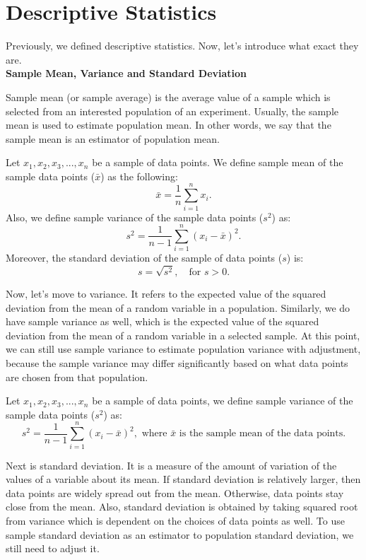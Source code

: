 \section{Descriptive Statistics}

Previously, we defined descriptive statistics. Now, let's introduce what exact they are.\\

\textbf{Sample Mean, Variance and Standard Deviation}

Sample mean (or sample average) is the average value of a sample which is selected from an interested population of an experiment. Usually, the sample mean is used to estimate population mean. In other words, we say that the sample mean is an estimator of population mean.

\begin{definition}
 Let $x_1, x_2, x_3, ..., x_n$ be a sample of data points. We define sample mean of the sample data points ($\bar{x}$) as the following: \[ \bar{x} = \frac{1}{n} \sum_{i=1}^{n} x_i.\] Also, we define sample variance of the sample data points ($s^2$) as: \[ s^2 = \frac{1}{n-1} \sum_{i=1}^{n}(x_i - \bar{x})^2.\] Moreover, the standard deviation of the sample of data points ($s$) is: \[ s = \sqrt{s^2}, \quad \text{for } s > 0.\]
\end{definition}

Now, let's move to variance. It refers to the expected value of the squared deviation from the mean of a random variable in a population. Similarly, we do have sample variance as well, which is the expected value of the squared deviation from the mean of a random variable in a selected sample. At this point, we can still use sample variance to estimate population variance with adjustment, because the sample variance may differ significantly based on what data points are chosen from that population.

\begin{definition}
Let $x_1, x_2, x_3, ..., x_n$ be a sample of data points, we define sample variance of the sample data points ($s^2$) as: \[ s^2 = \frac{1}{n-1} \sum_{i=1}^{n}(x_i - \bar{x})^2, \text{ where $\bar{x}$ is the sample mean of the data points.}\]
\end{definition}

Next is standard deviation. It is a measure of the amount of variation of the values of a variable about its mean. If standard deviation is relatively larger, then data points are widely spread out from the mean. Otherwise, data points stay close from the mean. Also, standard deviation is obtained by taking squared root from variance which is dependent on the choices of data points as well. To use sample standard deviation as an estimator to population standard deviation, we still need to adjust it.

